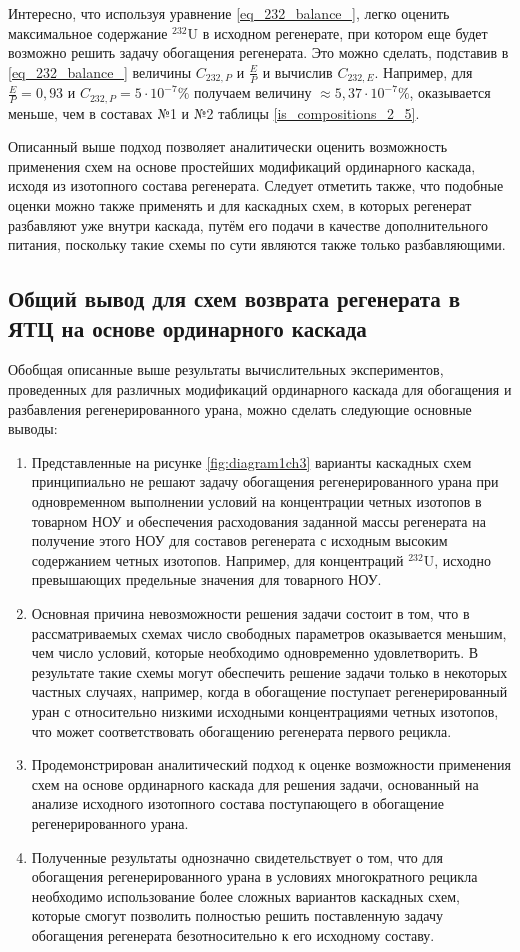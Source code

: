 Интересно, что используя уравнение \ref{eq_232_balance_}, легко оценить максимальное содержание $^{232}$U в исходном регенерате, при котором еще будет возможно решить задачу обогащения регенерата. Это можно сделать, подставив в \ref{eq_232_balance_} величины $C_{232,P}$ и $\frac{E}{P}$ и вычислив $C_{232,E}$. Например, для $\frac{E}{P}=0,93$ и $C_{232,P}=5\cdot10^{-7}\%$ получаем величину $\approx 5,37\cdot10^{-7}\%$, оказывается меньше, чем в составах №1 и №2 таблицы \ref{is_compositions_2_5}.

Описанный выше подход позволяет аналитически оценить возможность применения схем на основе простейших модификаций ординарного каскада, исходя из изотопного состава регенерата. Следует отметить также, что подобные оценки можно также применять и для каскадных схем, в которых регенерат разбавляют уже внутри каскада, путём его подачи в качестве дополнительного питания, поскольку такие схемы по сути являются также только разбавляющими.

\subsection{Общий вывод для схем возврата регенерата в ЯТЦ на основе ординарного каскада}\label{sec:ch2/sec2}

Обобщая описанные выше результаты вычислительных экспериментов, проведенных для различных модификаций ординарного каскада для обогащения и разбавления регенерированного урана, можно сделать следующие основные выводы:
\begin{enumerate}
  \item Представленные на рисунке \ref{fig:diagram1ch3} варианты каскадных схем принципиально не решают задачу обогащения регенерированного урана при одновременном выполнении условий на концентрации четных изотопов в товарном НОУ и обеспечения расходования заданной массы регенерата на получение этого НОУ для составов регенерата с исходным высоким содержанием четных изотопов. Например, для концентраций $^{232}$U, исходно превышающих предельные значения для товарного НОУ. 
  \item Основная причина невозможности решения задачи состоит в том, что в рассматриваемых схемах число свободных параметров оказывается меньшим, чем число условий, которые необходимо одновременно удовлетворить. В результате такие схемы могут обеспечить решение задачи только в некоторых частных случаях, например, когда в обогащение поступает регенерированный уран с относительно низкими исходными концентрациями четных изотопов, что может соответствовать обогащению регенерата первого рецикла.
  \item Продемонстрирован аналитический подход к оценке возможности применения схем на основе ординарного каскада для решения задачи, основанный на анализе исходного изотопного состава поступающего в обогащение регенерированного урана.
  \item Полученные результаты однозначно свидетельствует о том, что для обогащения регенерированного урана в условиях многократного рецикла необходимо использование более сложных вариантов каскадных схем, которые смогут позволить полностью решить поставленную задачу обогащения регенерата безотносительно к его исходному составу.
\end{enumerate}

